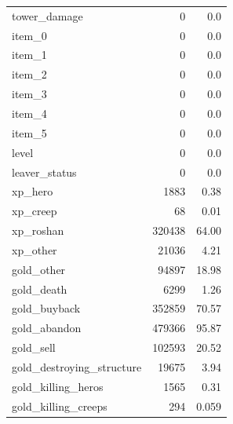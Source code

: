 \documentclass[a4paper,12pt,openany,oneside]{book}
\begin{document}
\begin{table}[H]
\begin{tabularx}{0.37\textwidth}{lrr}
		tower\_damage                        &   0             &   0.0                    \\
		item\_0                              &   0             &   0.0                    \\
		item\_1                              &   0             &   0.0                    \\
		item\_2                              &   0             &   0.0                    \\
		item\_3                              &   0             &   0.0                    \\
		item\_4                              &   0             &   0.0                    \\
		item\_5                              &   0             &   0.0                    \\
		level                               &   0             &   0.0                    \\
		leaver\_status                       &   0             &   0.0                    \\
		xp\_hero                             &   1883          &   0.38                 \\
		xp\_creep                            &   68            &   0.01                 \\
		xp\_roshan                           &   320438        &   64.00                \\
		xp\_other                            &   21036         &   4.21                 \\
		gold\_other                          &   94897         &   18.98                \\
		gold\_death                          &   6299          &   1.26                 \\
		gold\_buyback                        &   352859        &   70.57                \\
		gold\_abandon                        &   479366        &   95.87                \\
		gold\_sell                           &   102593        &   20.52                \\
		gold\_destroying\_structure           &   19675         &   3.94     \\
		gold\_killing\_heros                  &   1565          &   0.31                  \\
		gold\_killing\_creeps                 &   294           &   0.059                 \\

\end{tabularx}
\end{table}
\end{document}
